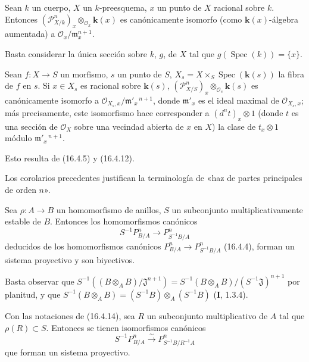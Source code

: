 \begin{corollary}[16.4.12]
\label{IV.16.4.12}
Sean $k$ un cuerpo, $X$ un $k$-preesquema, $x$ un punto de $X$ \textup{racional sobre}
$k$. Entonces $(\mathscr{P}_{X/k}^n)_x\otimes_{\mathcal{O}_x}\boldsymbol{k}(x)$ es
canónicamente isomorfo (como $\boldsymbol{k}(x)$-álgebra aumentada) a
$\mathcal{O}_x/\mathfrak{m}_x^{n+1}$.
\end{corollary}

Basta considerar la única sección sobre $k$, $g$, de $X$ tal que
$g(\operatorname{Spec}(k))=\{x\}$.

\begin{corollary}[16.4.13]
\label{IV.16.4.13}
Sean $f:X\to S$ un morfismo, $s$ un punto de $S$,
$X_s=X\times_S\operatorname{Spec}(\boldsymbol{k}(s))$ la fibra de $f$ en $s$. Si
$x\in X_s$ es \textup{racional sobre} $\boldsymbol{k}(s)$,
$(\mathscr{P}_{X/S}^n)_x\otimes_{\mathcal{O}_s}\boldsymbol{k}(s)$ es canónicamente
isomorfo a $\mathcal{O}_{X_s,x}/\mathfrak{m}'_x{}^{\,n+1}$, donde
$\mathfrak{m}'_x$ es el ideal maximal de $\mathcal{O}_{X_s,x}$; más
precisamente, este isomorfismo hace corresponder a $(d^n t)_x\otimes1$ \textup{(donde $t$ es
una sección de $\mathcal{O}_X$ sobre una vecindad abierta de $x$ en
$X$)} la clase de $t_x\otimes1$ módulo $\mathfrak{m}'_x{}^{\,n+1}$.
\end{corollary}

Esto resulta de (16.4.5) y (16.4.12).

Los corolarios precedentes justifican la terminología de «haz de partes
principales de orden $n$».

\begin{proposition}[16.4.14]
\label{IV.16.4.14}
Sea $\rho:A\to B$ un homomorfismo de anillos, $S$ un subconjunto
multiplicativamente estable de $B$. Entonces los homomorfismos canónicos
\[
  S^{-1}P_{B/A}^n\longrightarrow P_{S^{-1}B/A}^n
  \tag{16.4.14.1}
  \label{IV.16.4.14.1}
\]
deducidos de los homomorfismos canónicos
$P_{B/A}^n\to P_{S^{-1}B/A}^n$ \textup{(16.4.4)}, forman un sistema proyectivo y son
biyectivos.
\end{proposition}

Basta observar que
$S^{-1}((B\otimes_A B)/\mathfrak{J}^{n+1})
=S^{-1}(B\otimes_A B)/(S^{-1}\mathfrak{J})^{n+1}$
por planitud, y que
$S^{-1}(B\otimes_A B)=(S^{-1}B)\otimes_A(S^{-1}B)$ (\textbf I, 1.3.4).

\begin{corollary}[16.4.15]
\label{IV.16.4.15}
Con las notaciones de \textup{(16.4.14)}, sea $R$ un subconjunto multiplicativo de
$A$ tal que $\rho(R)\subset S$. Entonces se tienen isomorfismos canónicos
\[
  S^{-1}P_{B/A}^n\xrightarrow{\sim}P_{S^{-1}B/R^{-1}A}^n
  \tag{16.4.15.1}
  \label{IV.16.4.15.1}
\]
que forman un sistema proyectivo.
\end{corollary}


